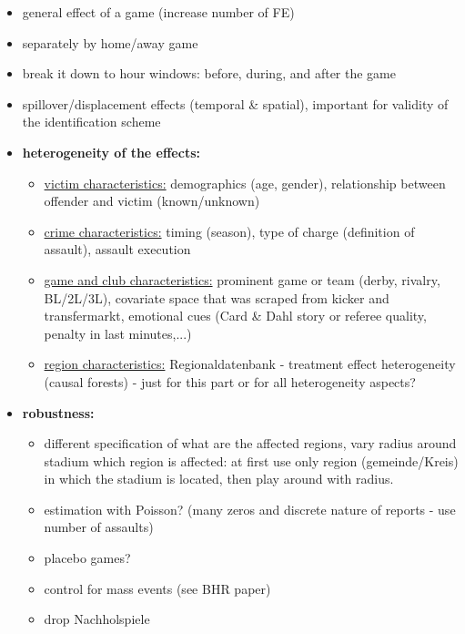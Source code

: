 \documentclass[11pt, a4paper]{article} %
\begin{document}
\begin{itemize}
	\item general effect of a game (increase number of FE)
	\item separately by home/away game
	\item break it down to hour windows: before, during, and after the game
	\item spillover/displacement effects (temporal \& spatial), important for validity of the identification scheme
	\item \textbf{heterogeneity of the effects:}
	\begin{itemize}
		\item \underline{victim characteristics:} demographics (age, gender), relationship between offender and victim (known/unknown)
		\item \underline{crime characteristics:} timing (season), type of charge (definition of assault), assault execution
		\item \underline{game and club characteristics:} prominent game or team (derby, rivalry, BL/2L/3L), covariate space that was scraped from kicker and transfermarkt, emotional cues (Card \& Dahl story or referee quality, penalty in last minutes,...)
		\item \underline{region characteristics:} Regionaldatenbank - treatment effect heterogeneity (causal forests) - just for this part or for all heterogeneity aspects?
	\end{itemize}
	\item \textbf{robustness:}
	\begin{itemize}
		\item different specification of what are the affected regions, vary radius around stadium which region is affected: at first use only region (gemeinde/Kreis) in which the stadium is located, then play around with radius.
		\item estimation with Poisson? (many zeros and discrete nature of reports - use number of assaults)
		\item placebo games?
		\item control for mass events (see BHR paper)
		\item drop Nachholspiele
	\end{itemize}
\end{itemize}
\end{document}
